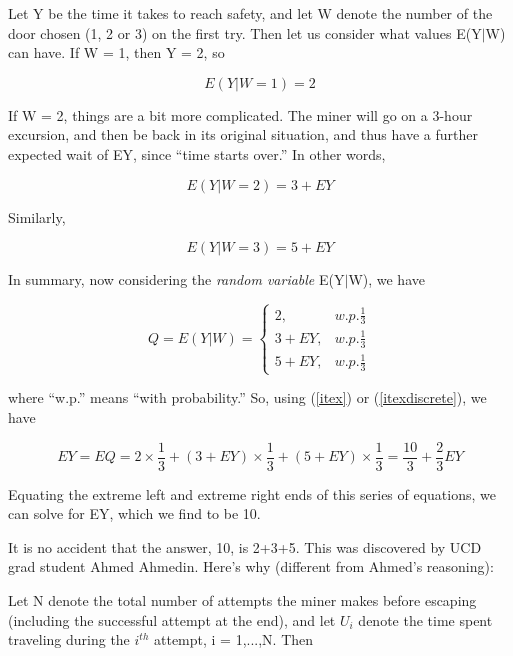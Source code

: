 Let Y be the time it takes to reach safety, and let W denote the number
of the door chosen (1, 2 or 3) on the first try. Then let us consider
what values E(Y$|$W) can have. If W = 1, then Y = 2, so

\begin{equation}
E(Y|W=1)=2
\end{equation}

If W = 2, things are a bit more complicated. The miner will go on a
3-hour excursion, and then be back in its original situation, and thus
have a further expected wait of EY, since ``time starts over.''  In
other words,

\begin{equation}
E(Y|W=2)=3+EY
\end{equation}


Similarly, 

\begin{equation}
E(Y|W=3)=5+EY
\end{equation}

In summary, now considering the \textit{random variable} E(Y$|$W), we have

\begin{equation}
Q=E(Y|W)=\left\{ \begin{array}{rl}
2, & w.p.\frac{1}{3}\\
3+EY, & w.p.\frac{1}{3}\\
5+EY, & w.p.\frac{1}{3}
\end{array}\right. 
\end{equation}

where ``w.p.'' means ``with probability.'' So, using (\ref{itex}) or
(\ref{itexdiscrete}), we have

\begin{equation}
EY=EQ=2\times \frac{1}{3}+(3+EY)\times \frac{1}{3}+(5+EY)\times \frac{1}{3}=\frac{10}{3}+\frac{2}{3}EY
\end{equation}

Equating the extreme left and extreme right ends of this series of equations,
we can solve for EY, which we find to be 10.

It is no accident that the answer, 10, is 2+3+5.  This was discovered by
UCD grad student Ahmed Ahmedin.  Here's why (different from Ahmed's
reasoning):

Let N denote the total number of attempts the miner makes before
escaping (including the successful attempt at the end), and let $U_i$
denote the time spent traveling during the $i^{th}$ attempt, i =
1,...,N.  Then

